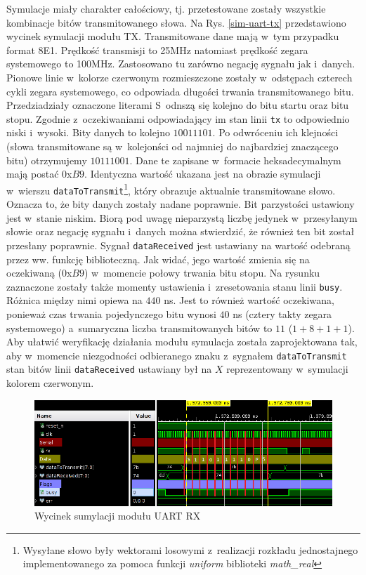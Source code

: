 Symulacje miały charakter całościowy, tj. przetestowane zostały wszystkie kombinacje bitów transmitowanego słowa. Na Rys. \ref{sim-uart-tx} przedstawiono wycinek symulacji modułu TX. Transmitowane dane mają w~tym przypadku format 8E1. Prędkość transmisji to 25MHz natomiast prędkość zegara systemowego to 100MHz. Zastosowano tu zarówno negację sygnału jak i~danych. Pionowe linie w~kolorze czerwonym rozmieszczone zostały w~odstępach czterech cykli zegara systemowego, co odpowiada długości trwania transmitowanego bitu. Przedziadziały oznaczone literami S~odnszą się kolejno do bitu startu oraz bitu stopu. Zgodnie z~oczekiwaniami odpowiadający im stan linii \verb|tx| to odpowiednio niski i~wysoki. Bity danych to kolejno $10011101$. Po odwróceniu ich klejności (słowa transmitowane są w~kolejonści od najmniej do najbardziej znaczącego bitu) otrzymujemy $10111001$. Dane te zapisane w~formacie heksadecymalnym mają postać $0$x$B9$. Identyczna wartość ukazana jest na obrazie symulacji w~wierszu \verb|dataToTransmit|\footnote{Wysyłane słowo były wektorami losowymi z~realizacji rozkładu jednostajnego implementowanego za pomoca funkcji \textit{uniform} biblioteki \textit{math\_real}}, który obrazuje aktualnie transmitowane słowo. Oznacza to, że bity danych zostały nadane poprawnie. Bit parzystości ustawiony jest w~stanie niskim. Biorą pod uwagę nieparzystą liczbę jedynek w~przesyłanym słowie oraz negację sygnału i~danych można stwierdzić, że również ten bit został przesłany poprawnie. Sygnał \verb|dataReceived| jest ustawiany na wartość odebraną przez ww. funkcję biblioteczną. Jak widać, jego wartość zmienia się na oczekiwaną ($0$x$B9$) w~momencie połowy trwania bitu stopu. Na rysunku zaznaczone zostały także momenty ustawienia i~zresetowania stanu linii \verb|busy|. Różnica między nimi opiewa na $440$ ns. Jest to również wartość oczekiwana, ponieważ czas trwania pojedynczego bitu wynosi $40$ ns (cztery takty zegara systemowego) a~sumaryczna liczba transmitowanych bitów to $11$ ($1 + 8 + 1 + 1$). Aby ułatwić weryfikację działania modułu symulacja została zaprojektowana tak, aby w~momencie niezgodności odbieranego znaku z~sygnałem \verb|dataToTransmit| stan bitów linii \verb|dataReceived| ustawiany był na $X$ reprezentowany w~symulacji kolorem czerwonym.

\vspace{0.5cm}
\begin{figure}[ht]
    \centering
    \includegraphics[width=\textwidth]{img/sim/communication/uart_rx_sim.png}
    \captionsetup{format=plain,justification=centering}
    \caption{Wycinek sumylacji modułu UART RX}
    \label{sim-uart-rx}
\end{figure}
\vspace{0.5cm}

